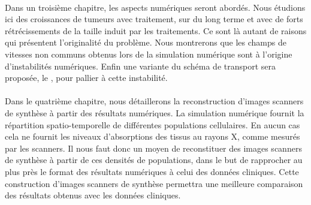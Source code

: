 \documentclass[main.tex]{subfiles}
\begin{document}
\paragraph{}
Dans un troisième chapitre, les aspects numériques seront abordés. 
Nous étudions ici des croissances de tumeurs avec traitement, sur du long terme et avec de forts rétrécissements de la taille induit par les traitements. Ce sont là autant de raisons qui présentent l'originalité du problème. Nous montrerons que les champs de vitesses non communs obtenus lors de la simulation numérique  sont à l'origine d'instabilités numériques. 
Enfin une variante du schéma de transport sera proposée, le \twinweno, pour pallier à cette instabilité.

\paragraph{}
Dans le quatrième chapitre, nous détaillerons la reconstruction %
d'images scanners de synthèse à partir des résultats numériques. La simulation numérique fournit la répartition spatio-temporelle de différentes populations cellulaires. En aucun cas cela ne fournit les niveaux d'absorptions des tissus au rayons X, comme mesurés par les scanners. Il nous faut donc un moyen de reconstituer des images scanners de synthèse à partir de ces densités de populations, dans le but de rapprocher au plus près %
le format des résultats numériques à celui des données cliniques.
Cette construction d'images scanners de synthèse permettra une meilleure comparaison des résultats obtenus avec les données cliniques. 
\end{document}
